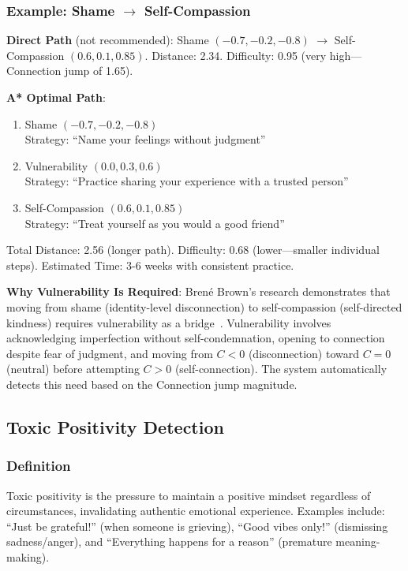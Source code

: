 \documentclass[10pt,twocolumn]{article}
\begin{document}
\subsubsection{Example: Shame $\rightarrow$ Self-Compassion}

\textbf{Direct Path} (not recommended): Shame $(-0.7, -0.2, -0.8)$ $\rightarrow$ Self-Compassion $(0.6, 0.1, 0.85)$. Distance: 2.34. Difficulty: 0.95 (very high—Connection jump of 1.65).

\textbf{A* Optimal Path}:
\begin{enumerate}
    \item Shame $(-0.7, -0.2, -0.8)$\\
    Strategy: ``Name your feelings without judgment''~\cite{linehan2015}

    \item Vulnerability $(0.0, 0.3, 0.6)$\\
    Strategy: ``Practice sharing your experience with a trusted person''~\cite{brown2012}

    \item Self-Compassion $(0.6, 0.1, 0.85)$\\
    Strategy: ``Treat yourself as you would a good friend''~\cite{neff2013}
\end{enumerate}

Total Distance: 2.56 (longer path). Difficulty: 0.68 (lower—smaller individual steps). Estimated Time: 3-6 weeks with consistent practice.

\textbf{Why Vulnerability Is Required}: Brené Brown's research demonstrates that moving from shame (identity-level disconnection) to self-compassion (self-directed kindness) requires vulnerability as a bridge~\cite{brown2012}. Vulnerability involves acknowledging imperfection without self-condemnation, opening to connection despite fear of judgment, and moving from $C < 0$ (disconnection) toward $C = 0$ (neutral) before attempting $C > 0$ (self-connection). The system automatically detects this need based on the Connection jump magnitude.

\subsection{Toxic Positivity Detection}

\subsubsection{Definition}

Toxic positivity is the pressure to maintain a positive mindset regardless of circumstances, invalidating authentic emotional experience. Examples include: ``Just be grateful!'' (when someone is grieving), ``Good vibes only!'' (dismissing sadness/anger), and ``Everything happens for a reason'' (premature meaning-making).
\end{document}
